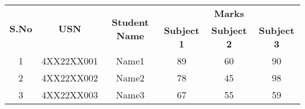 \documentclass{article}
\begin{document}
\begin{table}[ht]
\centering
\begin{tabular}{|c|c|c|c|c|c|}
\hline
\multirow{2}{*}{\textbf{S.No}} & \multirow{2}{*}{\textbf{USN}} & \multirow{2}{*}{\textbf{Student Name}} & \multicolumn{3}{c|}{\textbf{Marks}} \\
\cline{4-6}
 &  &  & \textbf{Subject 1} & \textbf{Subject 2} & \textbf{Subject 3} \\
\hline
1 & 4XX22XX001 & Name1 & 89 & 60 & 90 \\
2 & 4XX22XX002 & Name2 & 78 & 45 & 98 \\
3 & 4XX22XX003 & Name3 & 67 & 55 & 59 \\
\hline
\end{tabular}
\end{table}
\end{document}
